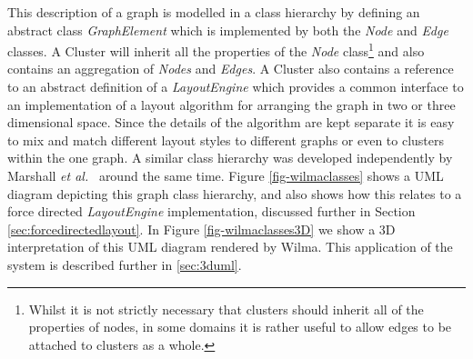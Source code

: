 \documentclass[runningheads]{cl2emult}
\begin{document}
This description of a graph is modelled in a class hierarchy by
defining an abstract class {\em GraphElement} which is implemented by
both the {\em Node} and {\em Edge} classes.  A {Cluster} will inherit
all the properties of the {\em Node} class\footnote{Whilst it is not strictly
necessary that clusters should inherit all of the properties of nodes, in some
domains it is rather useful to allow edges to be attached to clusters as a
whole.} and also contains an
aggregation of {\em Nodes} and {\em Edges}.  A {Cluster} also contains
a reference to an abstract definition of a {\em LayoutEngine} which
provides a common interface to an implementation of a layout algorithm
for arranging the graph in two or three dimensional space.  Since the
details of the algorithm are kept separate it is easy to mix and match
different layout styles to different graphs or even to clusters within
the one graph.  A similar class hierarchy was developed independently
by Marshall {\em et al.}~\cite{marshall00object} around the same time.
Figure \ref{fig-wilmaclasses} shows a UML diagram depicting this
graph class hierarchy, and also shows how this relates to a force
directed {\em LayoutEngine} implementation, discussed further in
Section \ref{sec:forcedirectedlayout}.  In Figure
\ref{fig-wilmaclasses3D} we show a 3D
interpretation of this UML diagram rendered by Wilma.  This application
of the system is described further in \ref{sec:3duml}.
\end{document}
